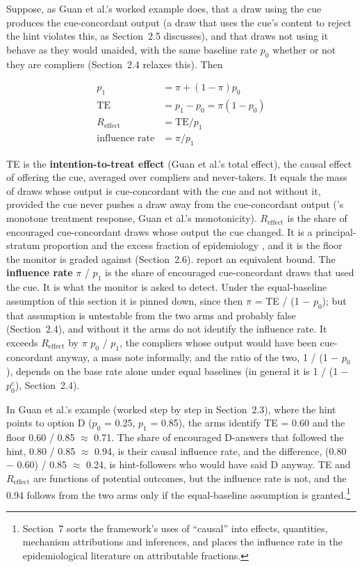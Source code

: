 \documentclass[11pt]{article}
\begin{document}
Suppose, as Guan et al.’s worked example does, that a draw using the cue produces the cue-concordant output (a draw that uses the cue’s content to reject the hint violates this, as Section~2.5 discusses), and that draws not using it behave as they would unaided, with the same baseline rate $p_0$ whether or not they are compliers (Section~2.4 relaxes this). Then

\begin{align*}
  p_1 &= \pi  + (1 - \pi ) p_0 \\
  \mathrm{TE} &= p_1 - p_0 = \pi  (1 - p_0) \\
  R_{\mathrm{effect}} &= \mathrm{TE} / p_1 \\
  \text{influence rate} &= \pi  / p_1
\end{align*}

TE is the \textbf{intention-to-treat effect} (Guan et al.’s total effect), the causal effect of offering the cue, averaged over compliers and never-takers. It equals the mass of draws whose output is cue-concordant with the cue and not without it, provided the cue never pushes a draw away from the cue-concordant output (\citeauthor{manski1997monotone}’s \citeyear{manski1997monotone} monotone treatment response, Guan et al.’s monotonicity). $R_{\mathrm{effect}}$ is the share of encouraged cue-concordant draws whose output the cue changed. It is a principal-stratum proportion \citep{frangakis2002principal} and the excess fraction of epidemiology \citep{greenland1988conceptual}, and it is the floor the monitor is graded against (Section~2.6). \citet{burger2026cot} report an equivalent bound. The \textbf{influence rate} $\pi$ / $p_1$ is the share of encouraged cue-concordant draws that used the cue. It is what the monitor is asked to detect. Under the equal-baseline assumption of this section it is pinned down, since then $\pi$ = TE / (1 $-$ $p_0$); but that assumption is untestable from the two arms and probably false (Section~2.4), and without it the arms do not identify the influence rate. It exceeds $R_{\mathrm{effect}}$ by $\pi$ $p_0$ / $p_1$, the compliers whose output would have been cue-concordant anyway, a mass \citet{dilgren2026evaluating} note informally, and the ratio of the two, 1 / (1 $-$ $p_0$), depends on the base rate alone under equal baselines (in general it is 1 / (1 $-$ $p_0^{c}$), Section~2.4).

In Guan et al.’s example (worked step by step in Section~2.3), where the hint points to option D ($p_0$ = 0.25, $p_1$ = 0.85), the arms identify TE = 0.60 and the floor 0.60 / 0.85 $\approx$ 0.71. The share of encouraged D-answers that followed the hint, 0.80 / 0.85 $\approx$ 0.94, is their causal influence rate, and the difference, (0.80 $-$ 0.60) / 0.85 $\approx$ 0.24, is hint-followers who would have said D anyway. TE and $R_{\mathrm{effect}}$ are functions of potential outcomes, but the influence rate is not, and the 0.94 follows from the two arms only if the equal-baseline assumption is granted.\footnote{Section~7 sorts the framework’s uses of “causal” into effects, quantities, mechanism attributions and inferences, and places the influence rate in the epidemiological literature on attributable fractions.}
\end{document}
